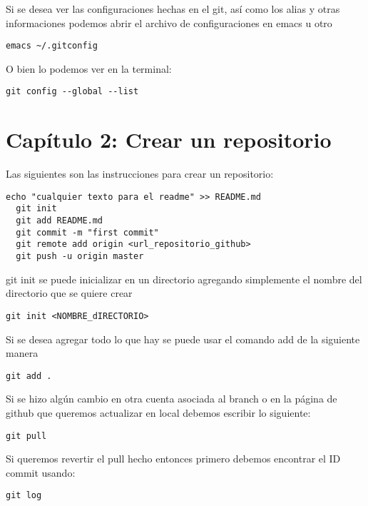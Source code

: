 Si se desea ver las configuraciones hechas en el git, as\'i como los alias y otras informaciones podemos abrir el archivo de configuraciones en emacs u otro

\begin{lstlisting}[numbers=none]
  emacs ~/.gitconfig
\end{lstlisting}

O bien lo podemos ver en la terminal:


\begin{lstlisting}[numbers=none]
  git config --global --list
\end{lstlisting}

\section{Cap\'itulo 2: Crear un repositorio}

Las siguientes son las instrucciones para crear un repositorio:


\begin{lstlisting}[numbers=none]
  echo "cualquier texto para el readme" >> README.md
  git init
  git add README.md
  git commit -m "first commit"
  git remote add origin <url_repositorio_github>
  git push -u origin master
\end{lstlisting}

git init se puede inicializar en un directorio agregando simplemente el nombre del directorio que se quiere crear


\begin{lstlisting}[numbers=none]
  git init <NOMBRE_dIRECTORIO>
\end{lstlisting}

Si se desea agregar todo lo que hay se puede usar el comando add de la siguiente manera


\begin{lstlisting}[numbers=none]
  git add .
\end{lstlisting}

Si se hizo alg\'un cambio en otra cuenta asociada al branch o en la p\'agina de github que queremos actualizar en local debemos escribir lo siguiente:


\begin{lstlisting}[numbers=none]
  git pull
\end{lstlisting}

Si queremos revertir el pull hecho entonces primero debemos encontrar el ID commit usando:
\begin{lstlisting}[numbers=none]
  git log
\end{lstlisting}

